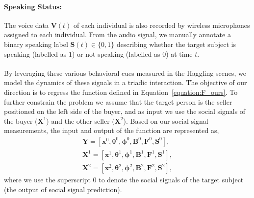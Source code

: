 \paragraph{Speaking Status:} The voice data $\mathbf{V}(t)$ of each individual is also recorded by wireless microphones assigned to each individual. From the audio signal, we manually annotate a binary speaking label $\mathbf{S}(t) \in \{0,1\}$ describing whether the target subject is speaking (labelled as $1$) or not speaking (labelled as $0$) at time $t$.\\%
\mbox{ }\\
By leveraging these various behavioral cues measured in the Haggling scenes, we model the dynamics of these signals in a triadic interaction. The objective of our direction is to regress the function defined in Equation~\ref{equation:F_ours}. To further constrain the problem we assume that the target person is the seller positioned on the left side of the buyer, and as input we use the social signals of the buyer ($\mathbf{X}^1$) and the other seller ($\mathbf{X}^2$). Based on our social signal measurements, the input and output of the function are represented as,
\begin{equation}
\begin{gathered}
\mathbf{Y} = [ \mathbf{x}^0, \boldsymbol{\theta}^0, \boldsymbol{\phi}^0, \mathbf{B}^0, \mathbf{F}^0, \mathbf{S}^0 ],\\
\mathbf{X}^1 = [ \mathbf{x}^1, \boldsymbol{\theta}^1, \boldsymbol{\phi}^1, \mathbf{B}^1, \mathbf{F}^1, \mathbf{S}^1 ],\\
\mathbf{X}^2 = [ \mathbf{x}^2, \boldsymbol{\theta}^2, \boldsymbol{\phi}^2, \mathbf{B}^2, \mathbf{F}^2, \mathbf{S}^2 ],
\end{gathered}
\end{equation}
where we use the superscript 0 to denote the social signals of the target subject (the output of social signal prediction).


